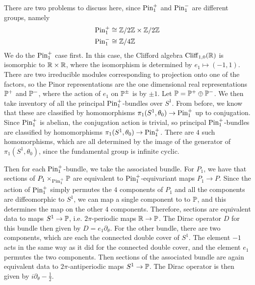 \begin{exmp} %
There are two problems to discuss here, since $\Pin_1^+$ and $\Pin_1^-$ are
different groups, namely
%
\begin{align*}
\Pin_1^+ &\cong \Z/2\Z \times \Z / 2\Z \\
\Pin_1^- &\cong \Z/4\Z
\end{align*}
%
We do the $\Pin_1^+$ case first. In this case, the Clifford algebra
$\Cliff_{1,0}(\R)$ is isomorphic to $\R \times \R$, where the isomorphism is
determined by $e_1 \mapsto (-1,1)$. There are two irreducible modules corresponding
to projection onto one of the factors, so the Pinor representations are the one
dimensional real representations $\P^+$ and $\P^-$, where the action of $e_1$ on
$\P^\pm$ is by $\pm 1$. Let $\P = \P^+ \oplus \P^-$. We then take inventory
of all the principal $\Pin_1^+$-bundles over $S^1$. From before, we know that these
are classified by homomorphisms $\pi_1(S^1, \theta_0) \to \Pin_1^+$ up to
conjugation. Since $\Pin_1^+$ is abelian, the conjugation action is trivial,
so principal $\Pin_1^+$-bundles are classified by homomorphisms
$\pi_1(S^1,\theta_0) \to \Pin_1^+$. There are $4$ such homomorphisms,
which are all determined by the image of the generator of $\pi_1(S^1,\theta_0)$,
since the fundamental group is infinite cyclic.








\iffalse
Then for each $\Pin_1^+$-bundle,
we take the associated bundle. For $P_1$, we have that sections of
$P_1 \times_{\Pin_1^+} \P$ are equivalent to $\Pin_1^+$-equivariant maps
$P_1 \to P$. Since the action of $\Pin_1^+$ simply permutes the $4$ components
of $P_1$ and all the components are diffeomorphic to $S^1$, we can map
a single component to to $\P$, and this determines the map on the other $4$
components. Therefore, sections are equivalent data to maps $S^1 \to \P$, i.e.
$2\pi$-periodic maps $\R \to \P$. The Dirac operator $D$ for this bundle then
given by $D = e_1\partial_\theta$. For the other bundle, there are two components,
which are each the connected double cover of $S^1$. The element $-1$ acts in the same
way as it did for the connected double cover, and the element $e_1$ permutes
the two components. Then sections of the associated bundle are again equivalent
data to $2\pi$-antiperiodic maps $S^1 \to \P$. The Dirac operator is then given
by $i\partial_\theta - \frac{1}{2}$. \\


\end{exmp}
